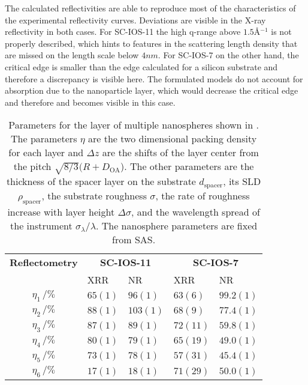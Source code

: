 \documentclass[\main/dresen_thesis.tex]{subfiles}
\begin{document}
  The calculated reflectivities are able to reproduce most of the characteristics of the experimental reflectivity curves.
  Deviations are visible in the X-ray reflectivity in both cases.
  For SC-IOS-11 the high q-range above $1.5 \unit{\angstrom^{-1}}$ is not properly described, which hints to features in the scattering length density that are missed on the length scale below $4 \unit{nm}$.
  For SC-IOS-7 on the other hand, the critical edge is smaller than the edge calculated for a silicon substrate and therefore a discrepancy is visible here.
  The formulated models do not account for absorption due to the nanoparticle layer, which would decrease the critical edge and therefore and becomes visible in this case.

  \begin{table}[!htbp]
    \centering
    \caption{\label{tab:looselyPackedNP:layers:reflectivity}Parameters for the layer of multiple nanospheres shown in . The parameters $\eta$ are the two dimensional packing density for each layer and $\Delta z$ are the shifts of the layer center from the pitch $\sqrt{8/3} (R+D_\mathrm{OA}$). The other parameters are the thickness of the spacer layer on the substrate $d_\mathrm{spacer}$, its SLD $\rho_\mathrm{spacer}$, the substrate roughness $\sigma$, the rate of roughness increase with layer height $\Delta \sigma$, and the wavelength spread of the instrument $\sigma_\lambda / \lambda$. The nanosphere parameters are fixed from SAS.}
    \begin{tabular}{ c | l | l | l | l}
      \rule{0pt}{2ex} \textbf{Reflectometry}  & \multicolumn{2}{c}{\textbf{SC-IOS-11}} & \multicolumn{2}{c}{\textbf{SC-IOS-7}} \\
      \rule{0pt}{2ex}                   & XRR       & NR        & XRR       & NR \\
      \hline
       $\eta_1     \, / \unit{\%}$      & $65(1)$   & $96(1)$   & $63(6)$   & $99.2(1)$\\
       $\eta_2     \, / \unit{\%}$      & $88(1)$   & $103(1)$  & $68(9)$   & $77.4(1)$\\
       $\eta_3     \, / \unit{\%}$      & $87(1)$   & $89(1)$   & $72(11)$  & $59.8(1)$\\
       $\eta_4     \, / \unit{\%}$      & $80(1)$   & $79(1)$   & $65(19)$  & $49.0(1)$\\
       $\eta_5     \, / \unit{\%}$      & $73(1)$   & $78(1)$   & $57(31)$  & $45.4(1)$\\
       $\eta_6     \, / \unit{\%}$      & $17(1)$   & $18(1)$   & $71(29)$  & $50.0(1)$\\

\end{tabular}
\end{table}
\end{document}
